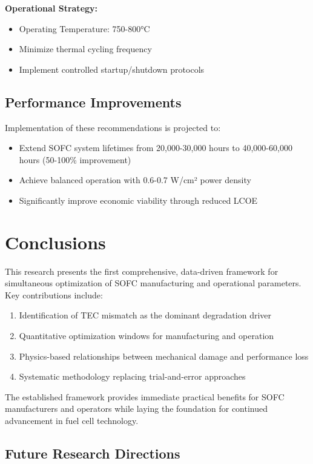 \documentclass[11pt,a4paper]{article}
\begin{document}
\textbf{Operational Strategy:}
\begin{itemize}
\item Operating Temperature: 750-800°C
\item Minimize thermal cycling frequency
\item Implement controlled startup/shutdown protocols
\end{itemize}

\subsection{Performance Improvements}

Implementation of these recommendations is projected to:
\begin{itemize}
\item Extend SOFC system lifetimes from 20,000-30,000 hours to 40,000-60,000 hours (50-100\% improvement)
\item Achieve balanced operation with 0.6-0.7 W/cm² power density
\item Significantly improve economic viability through reduced LCOE
\end{itemize}

\section{Conclusions}

This research presents the first comprehensive, data-driven framework for simultaneous optimization of SOFC manufacturing and operational parameters. Key contributions include:

\begin{enumerate}
\item Identification of TEC mismatch as the dominant degradation driver
\item Quantitative optimization windows for manufacturing and operation
\item Physics-based relationships between mechanical damage and performance loss
\item Systematic methodology replacing trial-and-error approaches
\end{enumerate}

The established framework provides immediate practical benefits for SOFC manufacturers and operators while laying the foundation for continued advancement in fuel cell technology.

\subsection{Future Research Directions}
\end{document}
